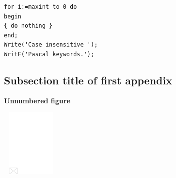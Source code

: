 \documentclass[AMA,STIX1COL]{WileyNJD-v2}
\begin{document}
\begin{lstlisting}[caption={Descriptive Caption Text},label=DescriptiveLabel]
for i:=maxint to 0 do
begin
{ do nothing }
end;
Write('Case insensitive ');
WritE('Pascal keywords.');
\end{lstlisting}



\subsection{Subsection title of first appendix\label{app1.1a}}

\noindent\textbf{Unnumbered figure}


\begin{center}
\includegraphics[width=7pc,height=8pc,draft]{empty}
\end{center}
\end{document}
